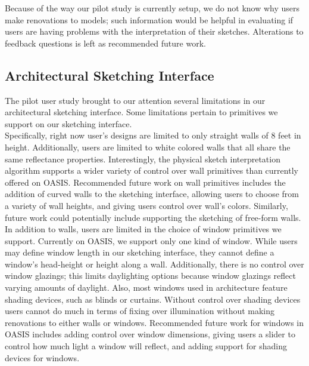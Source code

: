 Because of the way our pilot study is currently setup, we do not know why users make renovations to models; such information would be helpful in evaluating if users are having problems with the interpretation of their sketches.  Alterations to feedback questions is left as recommended future work.  \\


\subsection{Architectural Sketching Interface}

The pilot user study brought to our attention several limitations in our architectural sketching interface. Some limitations pertain to primitives we support on our sketching interface.\\

Specifically, right now user's designs are limited to only straight walls of 8 feet in height. Additionally, users are limited to white colored walls that all share the same reflectance properties. Interestingly, the physical sketch interpretation algorithm supports a wider variety of control over wall primitives than currently offered on OASIS. Recommended future work on wall primitives includes the addition of curved walls to the sketching interface, allowing users to choose from a variety of wall heights, and giving users control over wall's colors. Similarly, future work could potentially include supporting the sketching of free-form walls.  \\ 
    
In addition to walls, users are limited in the choice of window primitives we support. Currently on OASIS, we support only one kind of window.  While users may define window length in our sketching interface, they cannot define a window's head-height or height along a wall.  Additionally, there is no control over window glazings; this limits daylighting options because window glazings reflect varying amounts of daylight. Also, most windows used in architecture feature shading devices, such as blinds or curtains. Without control over shading devices users cannot do much in terms of fixing over illumination without making renovations to either walls or windows. Recommended future work for windows in OASIS includes adding control over window dimensions, giving users a slider to control how much light a window will reflect, and adding support for shading devices for windows.  \\
	

